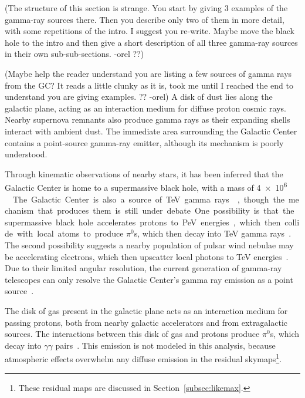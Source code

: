   {\color{red}(The structure of this section is strange. You start by giving 3 examples of the gamma-ray sources there. Then you describe only two of them in more detail, with some repetitions of the intro. I suggest you re-write. Maybe move the black hole to the intro and then give a short description of all three gamma-ray sources in their own sub-sub-sections. -orel ??)}

  {\color{red}(Maybe help the reader understand you are listing a few sources of gamma rays from the GC? It reads a little clunky as it is, took me until I reached the end to understand you are giving examples. ?? -orel)}
  A disk of dust lies along the galactic plane, acting as an interaction medium for diffuse proton cosmic rays.
  Nearby supernova remnants also produce gamma rays as their expanding shells interact with ambient dust.
  The immediate area surrounding the Galactic Center contains a point-source gamma-ray emitter, although its mechanism is poorly understood.

  Through kinematic observations of nearby stars, it has been inferred that the Galactic Center is home to a supermassive black hole, with a mass of \SI{4e6}{ \Msol{} }~\cite{sgra_massdist}.
  The Galactic Center is also a source of TeV gamma rays~\cite{gc_pointsrc_hess,gc_pointsource_hess2,gc_veritas_pointsource,gc_magic_pointsource}, though the mechanism that produces them is still under debate.
  One possibility is that the supermassive black hole accelerates protons to PeV energies, which then collide with local atoms to produce $\pi^0$s, which then decay into TeV gamma rays~\cite{gc_pevatron}.
  The second possibility suggests a nearby population of pulsar wind nebulae may be accelerating electrons, which then upscatter local photons to TeV energies~\cite{gc_pulsars}.
  Due to their limited angular resolution, the current generation of gamma-ray telescopes can only resolve the Galactic Center's gamma ray emission as a point source~\cite{VeritasGCRidge2015,gc_pointsrc_hess}.

  The disk of gas present in the galactic plane acts as an interaction medium for passing protons, both from nearby galactic accelerators and from extragalactic sources.
  The interactions between this disk of gas and protons produce $\pi^0$s, which decay into $\gamma\gamma$ pairs~\cite{hess_gc_diffuse}.
  This emission is not modeled in this analysis, because atmospheric effects overwhelm any diffuse emission in the residual skymaps\footnote{These residual maps are discussed in Section~\ref{subsec:likemax}.}.


